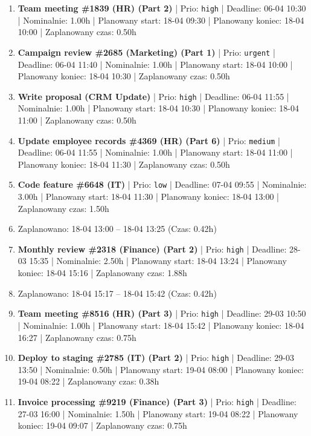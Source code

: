{\begin{enumerate}
  \item [\textbf{14610}] \textbf{Team meeting \#1839 (HR) (Part 2)} | Prio: \texttt{high} | Deadline: 06-04 10:30 | Nominalnie: 1.00h | Planowany start: 18-04 09:30 | Planowany koniec: 18-04 10:00 | Zaplanowany czas: 0.50h
  \item [\textbf{14607}] \textbf{Campaign review \#2685 (Marketing) (Part 1)} | Prio: \texttt{urgent} | Deadline: 06-04 11:40 | Nominalnie: 1.00h | Planowany start: 18-04 10:00 | Planowany koniec: 18-04 10:30 | Zaplanowany czas: 0.50h
  \item [\textbf{14629}] \textbf{Write proposal (CRM Update)} | Prio: \texttt{high} | Deadline: 06-04 11:55 | Nominalnie: 1.00h | Planowany start: 18-04 10:30 | Planowany koniec: 18-04 11:00 | Zaplanowany czas: 0.50h
  \item [\textbf{14658}] \textbf{Update employee records \#4369 (HR) (Part 6)} | Prio: \texttt{medium} | Deadline: 06-04 11:55 | Nominalnie: 1.00h | Planowany start: 18-04 11:00 | Planowany koniec: 18-04 11:30 | Zaplanowany czas: 0.50h
  \item [\textbf{14683}] \textbf{Code feature \#6648 (IT)} | Prio: \texttt{low} | Deadline: 07-04 09:55 | Nominalnie: 3.00h | Planowany start: 18-04 11:30 | Planowany koniec: 18-04 13:00 | Zaplanowany czas: 1.50h
  \item [\textbf{PRZERWA}] Zaplanowano: 18-04 13:00 -- 18-04 13:25 (Czas: 0.42h)
  \item [\textbf{14618}] \textbf{Monthly review \#2318 (Finance) (Part 2)} | Prio: \texttt{high} | Deadline: 28-03 15:35 | Nominalnie: 2.50h | Planowany start: 18-04 13:24 | Planowany koniec: 18-04 15:16 | Zaplanowany czas: 1.88h
  \item [\textbf{PRZERWA}] Zaplanowano: 18-04 15:17 -- 18-04 15:42 (Czas: 0.42h)
  \item [\textbf{14624}] \textbf{Team meeting \#8516 (HR) (Part 3)} | Prio: \texttt{high} | Deadline: 29-03 10:50 | Nominalnie: 1.00h | Planowany start: 18-04 15:42 | Planowany koniec: 18-04 16:27 | Zaplanowany czas: 0.75h
  \item [\textbf{14623}] \textbf{Deploy to staging \#2785 (IT) (Part 2)} | Prio: \texttt{high} | Deadline: 29-03 13:50 | Nominalnie: 0.50h | Planowany start: 19-04 08:00 | Planowany koniec: 19-04 08:22 | Zaplanowany czas: 0.38h
  \item [\textbf{14622}] \textbf{Invoice processing \#9219 (Finance) (Part 3)} | Prio: \texttt{high} | Deadline: 27-03 16:00 | Nominalnie: 1.50h | Planowany start: 19-04 08:22 | Planowany koniec: 19-04 09:07 | Zaplanowany czas: 0.75h

\end{enumerate}}
